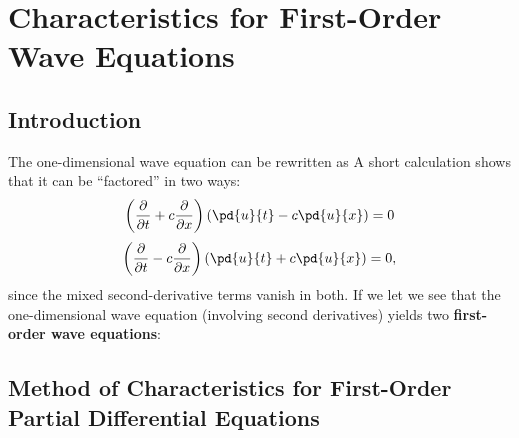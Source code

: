 \section{Characteristics for First-Order Wave Equations}
\label{sec:first-order-char}

\subsection{Introduction}
\label{sec:first-order-char-intro}

The one-dimensional wave equation can be rewritten as
A short calculation shows that it can be ``factored'' in two ways:
\[
\left(\frac{\partial}{\partial t} + c\frac{\partial}{\partial x}\right)\left(\pd{u}{t} - c\pd{u}{x}\right) = 0
\]
\[
\left(\frac{\partial}{\partial t} - c\frac{\partial}{\partial x}\right)\left(\pd{u}{t} + c\pd{u}{x}\right) = 0,
\]
since the mixed second-derivative terms vanish in both.  If we let
we see that the one-dimensional wave equation (involving second derivatives) yields two \textbf{first-order wave equations}:

\subsection{Method of Characteristics for First-Order Partial Differential Equations}
\label{sec:char-first-order-pde}

